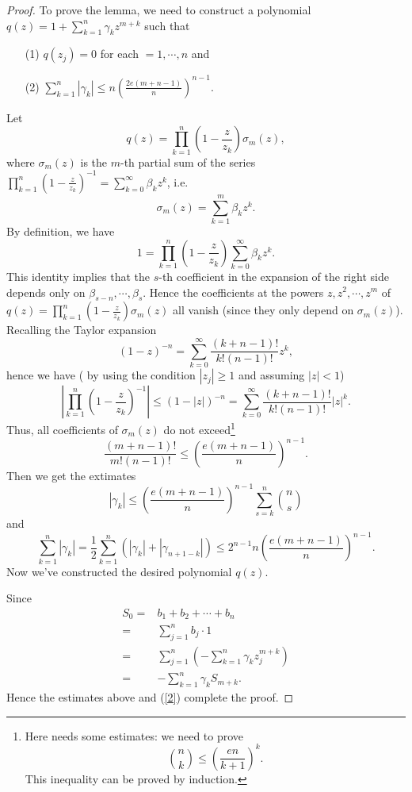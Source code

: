 \begin{proof}
  To prove the lemma, we need to construct a polynomial $q(z)=1+\sum_{k=1}^{n}\gamma_kz^{m+k}$ such that 
   \begin{itemize}
     \item [(1)] $q(z_j)=0$ for each $=1,\cdots,n$ and
     \item [(2)] $\sum_{k=1}^{n} \left| \gamma_k \right| \le n\left( \frac{2e(m+n-1)}{n} \right) ^{n-1}.$
  \end{itemize}
  Let 
  \[
    q(z)=\prod_{k=1}^{n}\left( 1-\frac{z}{z_k} \right) \sigma_m(z),
  \] 
  where $\sigma_m\left( z \right) $ is the $m$-th partial sum of the series $\prod_{k=1}^{n}\left( 1-\frac{z}{z_k} \right)^{-1} =\sum_{k=0}^{\infty}\beta_kz^{k}$, i.e. 
  \[
    \sigma_m(z)=\sum_{k=1}^{m} \beta_k z^{k}.
  \] 
  By definition, we have
  \[
    1=\prod_{k=1}^{n}\left( 1-\frac{z}{z_k} \right)\sum_{k=0}^{\infty}\beta_kz^{k}.
  \] 
  This identity implies that the $s$-th coefficient in the expansion of the right side depends only on $\beta_{s-n},\cdots,\beta_s$. Hence the coefficients at the powers $z,z^2,\cdots,z^{m}$ of $q(z)=\prod_{k=1}^{n}\left(1-\frac{z}{z_k}\right)\sigma_m(z)$ all vanish (since they only depend on $\sigma_m(z)$). Recalling the Taylor expansion
  \[
    \left( 1-z \right) ^{-n}=\sum_{k=0}^{\infty} \frac{(k+n-1)!}{k!(n-1)!}z^{k},
  \] 
  hence we have ( by using the condition $\left| z_j \right| \ge 1$ and assuming $\left| z \right| <1$)
 \[
   \left| \prod_{k=1}^{n}\left( 1-\frac{z}{z_k} \right)^{-1}  \right| \le \left( 1-\left|z\right| \right) ^{-n} =\sum_{k=0}^{\infty} \frac{(k+n-1)!}{k!(n-1)!}|z|^{k}.
 \] 
 Thus, all coefficients of $\sigma_m(z)$ do not exceed\footnote{ Here needs some estimates:
 we need to prove 
 \[
   \binom{n}{k}\le \left( \frac{en}{k+1} \right) ^{k}.
 \] 
 This inequality can be proved by induction.
 } 
\[
  \frac{(m+n-1)!}{m!(n-1)!}\le  \left( \frac{e(m+n-1)}{n} \right) ^{n-1}.
\]
Then we get the extimates
\[
  \left| \gamma_k \right| \le \left( \frac{e(m+n-1)}{n} \right)^{n-1}\sum_{s=k}^{n}\binom{n}{s} 
\] 
and 
\[
  \sum_{k=1}^{n}\left| \gamma_k \right| =\frac{1}{2}\sum_{k=1}^{n}\left( \left| \gamma_k \right| +\left| \gamma_{n+1-k} \right|  \right) \le 2^{n-1}n\left(  \frac{e(m+n-1)}{n} \right) ^{n-1}.
\]
Now we've constructed the desired polynomial $q(z)$.

Since
\begin{equation}
\begin{aligned}
  S_0 = & b_1+b_2+\cdots+b_n\\
  = & \sum_{j=1}^{n}b_j\cdot 1\\
  = & \sum_{j=1}^{n} \left( -\sum_{k=1}^{n} \gamma_k z_j^{m+k} \right)\\
  = & -\sum_{k=1}^{n} \gamma_k S_{m+k}
.\label{2}\end{aligned}
\end{equation}
Hence the estimates above and (\ref{2}) complete the proof.
\end{proof}

